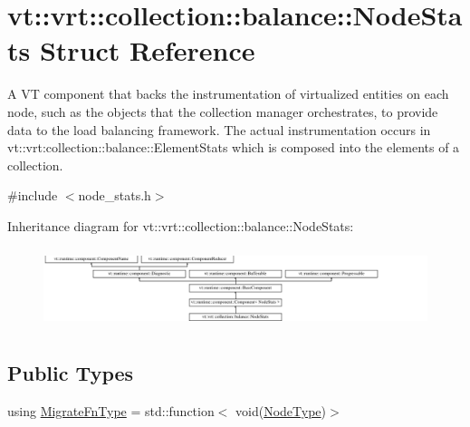\hypertarget{structvt_1_1vrt_1_1collection_1_1balance_1_1_node_stats}{}\section{vt\+:\+:vrt\+:\+:collection\+:\+:balance\+:\+:Node\+Stats Struct Reference}
\label{structvt_1_1vrt_1_1collection_1_1balance_1_1_node_stats}


A VT component that backs the instrumentation of virtualized entities on each node, such as the objects that the collection manager orchestrates, to provide data to the load balancing framework. The actual instrumentation occurs in {\ttfamily vt\+::vrt\+:collection\+:}\+:balance\+::\+Element\+Stats which is composed into the elements of a collection.  




{\ttfamily \#include $<$node\+\_\+stats.\+h$>$}

Inheritance diagram for vt\+:\+:vrt\+:\+:collection\+:\+:balance\+:\+:Node\+Stats\+:\begin{figure}[H]
\begin{center}
\leavevmode
\includegraphics[height=2.380952cm]{structvt_1_1vrt_1_1collection_1_1balance_1_1_node_stats}
\end{center}
\end{figure}
\subsection*{Public Types}
\begin{DoxyCompactItemize}
\item 
using \hyperlink{structvt_1_1vrt_1_1collection_1_1balance_1_1_node_stats_af702e521887d9015e33a7aedda48d09d}{Migrate\+Fn\+Type} = std\+::function$<$ void(\hyperlink{namespacevt_a866da9d0efc19c0a1ce79e9e492f47e2}{Node\+Type})$>$
\end{DoxyCompactItemize}
